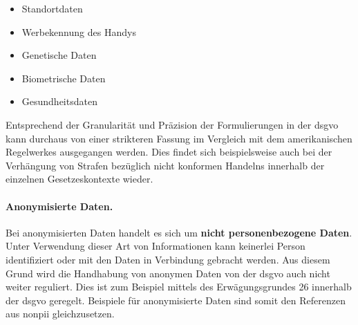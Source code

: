 \begin{itemize}
	\item Standortdaten
	\item Werbekennung des Handys
	\item Genetische Daten
	\item Biometrische Daten
	\item Gesundheitsdaten
\end{itemize}

\noindent Entsprechend der Granularität und Präzision der Formulierungen in der \ac{dsgvo} kann durchaus von einer strikteren Fassung im Vergleich mit dem amerikanischen Regelwerkes ausgegangen werden. Dies findet sich beispielsweise auch bei der Verhängung von Strafen bezüglich nicht konformen Handelns innerhalb der einzelnen Gesetzeskontexte wieder.


\paragraph{Anonymisierte Daten.}
\label{sec:Grundlagen:para:Anonymisierte Daten}
Bei anonymisierten Daten handelt es sich um \textbf{nicht personenbezogene Daten}. Unter Verwendung dieser Art von Informationen kann keinerlei Person identifiziert oder mit den Daten in Verbindung gebracht werden. Aus diesem Grund wird die Handhabung von anonymen Daten von der \ac{dsgvo} auch nicht weiter reguliert. Dies ist zum Beispiel mittels des Erwägungsgrundes 26 \cite{DSGVOEg26} innerhalb der \ac{dsgvo} geregelt. Beispiele für anonymisierte Daten sind somit den Referenzen aus \ac{nonpii} gleichzusetzen.


